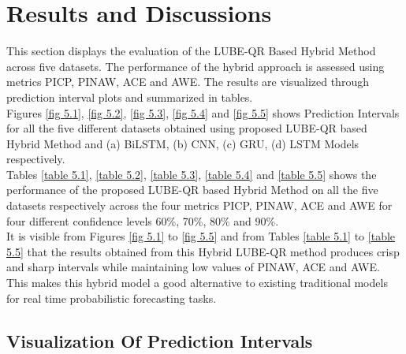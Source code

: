 \section{Results and Discussions}
This section displays the evaluation of the LUBE-QR Based Hybrid Method across five datasets. The performance of the hybrid approach is assessed using metrics PICP, PINAW, ACE and AWE. The results are visualized through prediction interval plots and summarized in tables.\\ 

Figures \ref{fig 5.1}, \ref{fig 5.2}, \ref{fig 5.3}, \ref{fig 5.4} and \ref{fig 5.5} shows Prediction Intervals for all the five different datasets obtained using proposed LUBE-QR based Hybrid Method and (a) BiLSTM, (b) CNN, (c) GRU, (d) LSTM Models respectively.\\

Tables \ref{table 5.1}, \ref{table 5.2}, \ref{table 5.3}, \ref{table 5.4} and \ref{table 5.5} shows the performance of the proposed LUBE-QR based Hybrid Method on all the five datasets respectively across the four metrics PICP, PINAW, ACE and AWE for four different confidence levels 60\%, 70\%, 80\% and 90\%.\\

It is visible from Figures \ref{fig 5.1} to \ref{fig 5.5} and from Tables \ref{table 5.1} to \ref{table 5.5} that the results obtained from this Hybrid LUBE-QR method produces crisp and sharp intervals while maintaining low values of PINAW, ACE and AWE. This makes this hybrid model a good alternative to existing traditional models for real time probabilistic forecasting tasks.

\subsection{Visualization Of Prediction Intervals}

